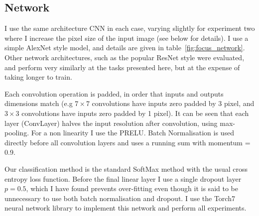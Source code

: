 \subsection {Network}

I use the same architecture CNN in each case, varying slightly for experiment two where I increase the pixel size of the input image (see below for details). I use a simple AlexNet \cite {Krizhevsky2012} style model, and details are given in table~\ref{fig:focus_network}. Other network architectures, such as the popular ResNet \cite{He2015} style were evaluated, and perform very similarly at the tasks presented here, but at the expense of taking longer to train.

Each convolution operation is padded, in order that inputs and outputs dimensions match (e.g $ 7\times7 $ convolutions have inputs zero padded by 3 pixel, and $3\times3$ convolutions have inputs zero padded by 1 pixel). It can be seen that each layer (ConvLayer) halves the input resolution after convolution, using max-pooling. For a non linearity I use the \gls{PRELU}. Batch Normalisation is used directly before all convolution layers and uses a running sum with momentum = 0.9.

Our classification method is the standard SoftMax method with the usual cross entropy loss function. Before the final linear layer I use a single dropout layer $ p = 0.5 $, which I have found prevents over-fitting even though it is said to be unnecessary to use both batch normalisation and dropout.  I use the Torch7 \cite{Collobert2011a} neural network library to implement this network and perform all experiments. 


